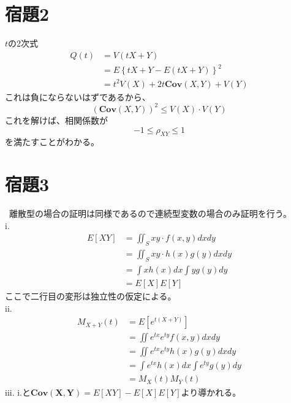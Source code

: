 \documentclass[10pt,a4paper]{ltjsarticle}       %
\begin{document}
\section{宿題2}
$t$の2次式
\begin{align}
Q(t) &= V(tX+Y) \\
       &= E\left\{ tX + Y - E(tX + Y) \right\}^2 \\
       &= t^2V(X) + 2t \mathbf{Cov}(X, Y) + V(Y)
\end{align}
これは負にならないはずであるから、
\begin{equation}
\left(\mathbf{Cov}(X, Y)\right)^2\le V(X) \cdot V(Y)
\end{equation}
これを解けば、相関係数が
\begin{equation}
-1 \le \rho_{XY} \le 1
\end{equation}
を満たすことがわかる。
\section{宿題3}
 離散型の場合の証明は同様であるので連続型変数の場合のみ証明を行う。\\
i.
\begin{align}
E[XY] &= \iint_S xy \cdot f(x, y) dx dy \\
          &= \iint_S xy \cdot h(x)g(y) dx dy \\
          &= \int x h(x) dx \int y g(y) dy \\
          &= E[X]E[Y]
\end{align}
ここで二行目の変形は独立性の仮定による。\\
ii.
\begin{align}
M_{X+Y}(t) &= E[e^{t(X+Y)}] \\
                   &= \iint e^{tx} e^{ty} f(x, y) dx dy \\
                   &= \iint e^{tx} e^{ty} h(x)g(y) dx dy \\
                   &= \int e^{tx} h(x) dx \int e^{ty} g(y) dy \\
                   &= M_X(t)M_Y(t)
\end{align}
iii.
i.と$\mathbf{Cov(X, Y)} = E[XY] - E[X]E[Y]$より導かれる。
\end{document}
